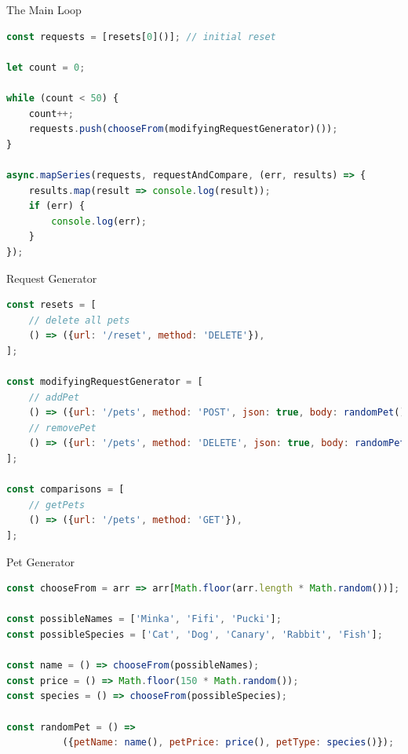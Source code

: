 \begin{frame}[fragile]{The Main Loop}

\begin{lstlisting}[language=JavaScript]
const requests = [resets[0]()]; // initial reset

let count = 0;

while (count < 50) {
    count++;
    requests.push(chooseFrom(modifyingRequestGenerator)());
}

async.mapSeries(requests, requestAndCompare, (err, results) => {
    results.map(result => console.log(result));
    if (err) {
        console.log(err);
    }
});
\end{lstlisting}

\end{frame}

\begin{frame}[fragile]{Request Generator}

\begin{lstlisting}[language=JavaScript]
const resets = [
    // delete all pets
    () => ({url: '/reset', method: 'DELETE'}),
];

const modifyingRequestGenerator = [
    // addPet
    () => ({url: '/pets', method: 'POST', json: true, body: randomPet()}),
    // removePet
    () => ({url: '/pets', method: 'DELETE', json: true, body: randomPet()})
];

const comparisons = [
    // getPets
    () => ({url: '/pets', method: 'GET'}),
];
\end{lstlisting}

\end{frame}


\begin{frame}[fragile]{Pet Generator}

\begin{lstlisting}[language=JavaScript]
const chooseFrom = arr => arr[Math.floor(arr.length * Math.random())];

const possibleNames = ['Minka', 'Fifi', 'Pucki'];
const possibleSpecies = ['Cat', 'Dog', 'Canary', 'Rabbit', 'Fish'];

const name = () => chooseFrom(possibleNames);
const price = () => Math.floor(150 * Math.random());
const species = () => chooseFrom(possibleSpecies);

const randomPet = () => 
          ({petName: name(), petPrice: price(), petType: species()});
\end{lstlisting}

\end{frame}

